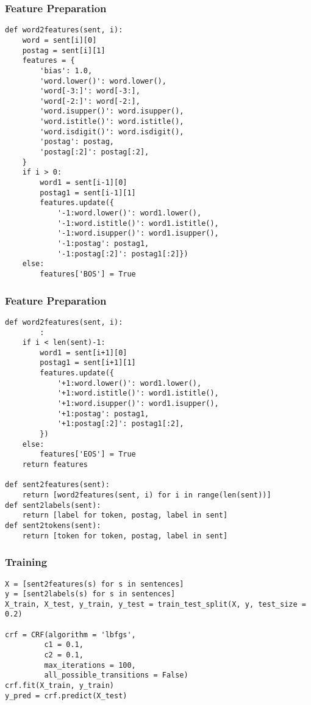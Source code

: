 \begin{frame}[fragile]\frametitle{Feature Preparation}


\begin{lstlisting}
def word2features(sent, i):
    word = sent[i][0]
    postag = sent[i][1]
    features = {
        'bias': 1.0,
        'word.lower()': word.lower(),
        'word[-3:]': word[-3:],
        'word[-2:]': word[-2:],
        'word.isupper()': word.isupper(),
        'word.istitle()': word.istitle(),
        'word.isdigit()': word.isdigit(),
        'postag': postag,
        'postag[:2]': postag[:2],
    }
    if i > 0:
        word1 = sent[i-1][0]
        postag1 = sent[i-1][1]
        features.update({
            '-1:word.lower()': word1.lower(),
            '-1:word.istitle()': word1.istitle(),
            '-1:word.isupper()': word1.isupper(),
            '-1:postag': postag1,
            '-1:postag[:2]': postag1[:2]})
    else:
        features['BOS'] = True
\end{lstlisting}
\end{frame}

\begin{frame}[fragile]\frametitle{Feature Preparation}


\begin{lstlisting}
def word2features(sent, i):
		:
    if i < len(sent)-1:
        word1 = sent[i+1][0]
        postag1 = sent[i+1][1]
        features.update({
            '+1:word.lower()': word1.lower(),
            '+1:word.istitle()': word1.istitle(),
            '+1:word.isupper()': word1.isupper(),
            '+1:postag': postag1,
            '+1:postag[:2]': postag1[:2],
        })
    else:
        features['EOS'] = True
    return features
		
def sent2features(sent):
    return [word2features(sent, i) for i in range(len(sent))]
def sent2labels(sent):
    return [label for token, postag, label in sent]
def sent2tokens(sent):
    return [token for token, postag, label in sent]		
\end{lstlisting}
\end{frame}

\begin{frame}[fragile]\frametitle{Training}


\begin{lstlisting}
X = [sent2features(s) for s in sentences]
y = [sent2labels(s) for s in sentences]
X_train, X_test, y_train, y_test = train_test_split(X, y, test_size = 0.2)

crf = CRF(algorithm = 'lbfgs',
         c1 = 0.1,
         c2 = 0.1,
         max_iterations = 100,
         all_possible_transitions = False)
crf.fit(X_train, y_train)
y_pred = crf.predict(X_test)
\end{lstlisting}
\end{frame}

